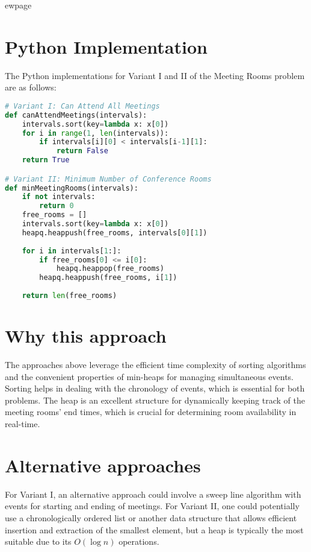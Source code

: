 ewpage %
\section*{Python Implementation}

The Python implementations for Variant I and II of the Meeting Rooms problem are as follows:

\begin{fullwidth}
\begin{lstlisting}[language=Python]
# Variant I: Can Attend All Meetings
def canAttendMeetings(intervals):
    intervals.sort(key=lambda x: x[0])
    for i in range(1, len(intervals)):
        if intervals[i][0] < intervals[i-1][1]:
            return False
    return True

# Variant II: Minimum Number of Conference Rooms
def minMeetingRooms(intervals):
    if not intervals:
        return 0
    free_rooms = []
    intervals.sort(key=lambda x: x[0])
    heapq.heappush(free_rooms, intervals[0][1])
    
    for i in intervals[1:]:
        if free_rooms[0] <= i[0]:
            heapq.heappop(free_rooms)
        heapq.heappush(free_rooms, i[1])
    
    return len(free_rooms)
\end{lstlisting}

\end{fullwidth}

\section*{Why this approach}
The approaches above leverage the efficient time complexity of sorting algorithms and the convenient properties of min-heaps for managing simultaneous events. Sorting helps in dealing with the chronology of events, which is essential for both problems. The heap is an excellent structure for dynamically keeping track of the meeting rooms' end times, which is crucial for determining room availability in real-time.

\section*{Alternative approaches}
For Variant I, an alternative approach could involve a sweep line algorithm with events for starting and ending of meetings. For Variant II, one could potentially use a chronologically ordered list or another data structure that allows efficient insertion and extraction of the smallest element, but a heap is typically the most suitable due to its \(O(\log n)\) operations.

